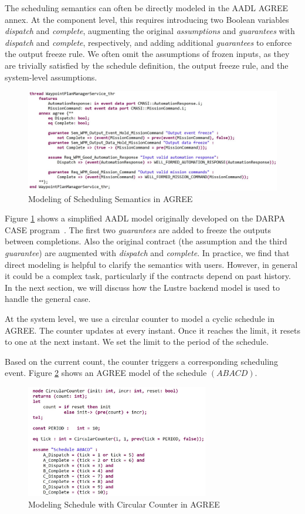 The scheduling semantics can often be directly modeled in the AADL AGREE annex. At the component level, this requires introducing two Boolean variables \emph{dispatch} and \emph{complete}, augmenting the original \emph{assumptions} and \emph{guarantees} with \emph{dispatch} and \emph{complete}, respectively, and adding additional \emph{guarantees} to enforce the output freeze rule. We often omit the assumptions of frozen inputs, as they are trivially satisfied by the schedule definition, the output freeze rule, and the system-level assumptions.

\begin{figure}[t!]
\centering
\includegraphics[width=\columnwidth]{wpmAGREE3.jpg}
\caption{Modeling of Scheduling Semantics in AGREE\label{wpmAGREE}}
\end{figure}

Figure \ref{wpmAGREE} shows a simplified AADL model originally developed on the DARPA CASE program~\cite{MODELS}. The first two \emph{guarantees} are added to freeze the outputs between completions. Also the original contract (the assumption and the third \emph{guarantee}) are augmented with \emph{dispatch} and \emph{complete}.
In practice, we find that direct modeling is helpful to clarify the semantics with users. However, in general it could be a complex task, particularly if the contracts depend on past history. In the next section, we will discuss how the Lustre backend model is used to handle the general case.

At the system level, we use a circular counter to model a cyclic schedule in AGREE. 
The counter updates at every instant. Once it reaches the limit, it resets to one at the next instant.
We set the limit to the period of the schedule. 

Based on the current count, the counter triggers a corresponding scheduling event.
Figure \ref{schedule} shows an AGREE model of the schedule $(ABACD)$.

\begin{figure}[t!]
\centering
\includegraphics[width=80mm]{schedule.jpg}
\caption{Modeling Schedule with Circular Counter in AGREE\label{schedule}}
\end{figure}

